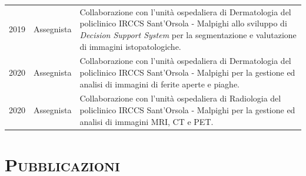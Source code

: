 \documentclass[a4paper,11pt]{article}
\begin{document}
\begin{tabular}{llp{12cm}}
  2019\textemdash2022 & Assegnista      & Collaborazione con l'unità ospedaliera di Dermatologia del policlinico IRCCS Sant'Orsola - Malpighi allo sviluppo di \emph{Decision Support System} per la segmentazione e valutazione di immagini istopatologiche.\\
  2020\textemdash2022 & Assegnista      & Collaborazione con l'unità ospedaliera di Dermatologia del policlinico IRCCS Sant'Orsola - Malpighi per la gestione ed analisi di immagini di ferite aperte e piaghe.\\
  2020\textemdash2022 & Assegnista      & Collaborazione con l'unità ospedaliera di Radiologia del policlinico IRCCS Sant'Orsola - Malpighi per la gestione ed analisi di immagini MRI, CT e PET.\\

\end{tabular}




\vspace*{0.5cm}
\section*{\scshape{Pubblicazioni}}
\end{document}
